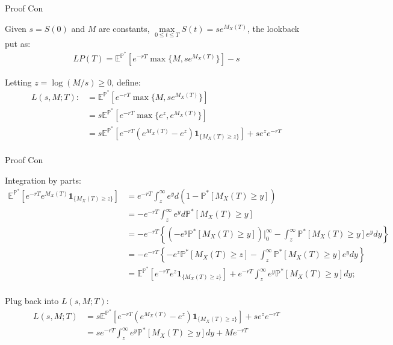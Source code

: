 \documentclass{beamer}
\begin{document}
\begin{frame}{Proof Con}

    {\footnotesize \footnotesize
    \par Given $s = S(0)$ and $M$ are constants, \(\max\limits_{0 \leq t \leq T} S(t) = s  e^{M_X(T)}\), the lookback put as:
    \vspace{1em}
    \begin{align*}
      LP(T) = \mathbb{E}^{\mathbb{P}^*} \left[ e^{-rT} \max\{M, se^{M_X(T)}\} \right] - s
    \end{align*}
     \vspace{1em}
    \par  \pause  Letting \(z=\log(M/s)\geq 0\), define:
     \vspace{1em}
    \begin{align*}
      L(s, M; T)  :&= \mathbb{E}^{\mathbb{P}^*} \left[ e^{-rT} \max\{M, se^{M_X(T)}\} \right] \\
      &= s  \mathbb{E}^{\mathbb{P}^*} \left[ e^{-rT} \max\{e^z, e^{M_X(T)}\} \right]\\
      &  = s  \mathbb{E}^{\mathbb{P}^*} \left[ e^{-rT} \left( e^{M_X(T)} - e^z \right) \mathbf{1}_{\{M_X(T) \geq z\}} \right] + s  e^z  e^{-rT}\\
    \end{align*}
    }
    
\end{frame}
\begin{frame}{Proof Con}

    {\footnotesize \footnotesize
    \par Integration by parts:
    {\footnotesize \tiny
    \begin{align*}
      \mathbb{E}^{\mathbb{P}^*} \left[ e^{-rT} e^{M_X(T)} \mathbf{1}_{\{M_X(T) \geq z\}} \right] 
      & = e^{-rT} \int_{z}^{\infty} e^y  d(1-\mathbb{P}^* [M_X(T) \geq y])\\
      & = -e^{-rT} \int_{z}^{\infty} e^y  d\mathbb{P}^* [M_X(T) \geq y]\\
      & = -e^{-rT} \left\{ \left(-e^y \mathbb{P}^* [M_X(T) \geq y]\right)\bigg|_0^{\infty} - 
      \int_{z}^{\infty} \mathbb{P}^* [M_X(T) \geq y] e^y  dy \right\}\\
      &= -e^{-rT} \left\{ -e^z \mathbb{P}^* [M_X(T) \geq z] - \int_{z}^{\infty} \mathbb{P}^* [M_X(T) \geq y] e^y  dy \right\}\\
      &= \mathbb{E}^{\mathbb{P}^*} \left[ e^{-rT} e^z \mathbf{1}_{\{M_X(T) \geq z\}} \right] + e^{-rT} \int_{z}^{\infty} e^y \mathbb{P}^* [M_X(T) \geq y]  dy;\\
    \end{align*}
    }
    \par \pause  Plug back into $ L(s, M; T)$:
    {\footnotesize \tiny
    \begin{align*}
       L(s, M; T) & = s  \mathbb{E}^{\mathbb{P}^*} \left[ e^{-rT} \left( e^{M_X(T)} - e^z \right) \mathbf{1}_{\{M_X(T) \geq z\}} \right] + s  e^z  e^{-rT}\\
       & =  se^{-rT} \int_{z}^{\infty} e^{y} \mathbb{P}^*[M_X(T) \geq y] dy + Me^{-rT} \\
    \end{align*}
    }
    }
    
\end{frame}
\end{document}
